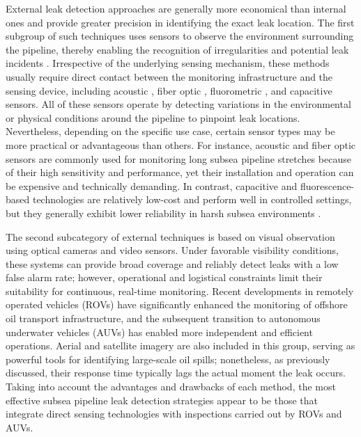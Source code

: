 \documentclass{iopjournal}
\begin{document}
External leak detection approaches are generally more economical than internal ones and provide greater precision in identifying the exact leak location. The first subgroup of such techniques uses sensors to observe the environment surrounding the pipeline, thereby enabling the recognition of irregularities and potential leak incidents \cite{ho2020inspection}. Irrespective of the underlying sensing mechanism, these methods usually require direct contact between the monitoring infrastructure and the sensing device, including acoustic \cite{martini2016leak}, fiber optic \cite{jacobsz2024performance}, fluorometric \cite{jasper2012oil}, and capacitive \cite{dario2019method} sensors. All of these sensors operate by detecting variations in the environmental or physical conditions around the pipeline to pinpoint leak locations. Nevertheless, depending on the specific use case, certain sensor types may be more practical or advantageous than others. For instance, acoustic and fiber optic sensors are commonly used for monitoring long subsea pipeline stretches because of their high sensitivity and performance, yet their installation and operation can be expensive and technically demanding. In contrast, capacitive and fluorescence-based technologies are relatively low-cost and perform well in controlled settings, but they generally exhibit lower reliability in harsh subsea environments \cite{adegboye2019recent}.

The second subcategory of external techniques is based on visual observation using optical cameras and video sensors. Under favorable visibility conditions, these systems can provide broad coverage and reliably detect leaks with a low false alarm rate; however, operational and logistical constraints limit their suitability for continuous, real-time monitoring. Recent developments in remotely operated vehicles (ROVs)\cite{hu2022underwater} have significantly enhanced the monitoring of offshore oil transport infrastructure, and the subsequent transition to autonomous underwater vehicles (AUVs)\cite{shukla2016application} has enabled more independent and efficient operations. Aerial and satellite imagery are also included in this group, serving as powerful tools for identifying large-scale oil spills; nonetheless, as previously discussed, their response time typically lags the actual moment the leak occurs. Taking into account the advantages and drawbacks of each method, the most effective subsea pipeline leak detection strategies appear to be those that integrate direct sensing technologies with inspections carried out by ROVs and AUVs\cite{lukonge2020leak}.
\end{document}
